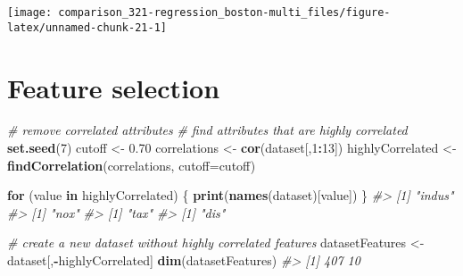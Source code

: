 \documentclass[]{book}
\newenvironment{Shaded}{\begin{snugshade}}{\end{snugshade}}
\newcommand{\CommentTok}[1]{\textcolor[rgb]{0.56,0.35,0.01}{\textit{#1}}}
\newcommand{\ControlFlowTok}[1]{\textcolor[rgb]{0.13,0.29,0.53}{\textbf{#1}}}
\newcommand{\DataTypeTok}[1]{\textcolor[rgb]{0.13,0.29,0.53}{#1}}
\newcommand{\DecValTok}[1]{\textcolor[rgb]{0.00,0.00,0.81}{#1}}
\newcommand{\FloatTok}[1]{\textcolor[rgb]{0.00,0.00,0.81}{#1}}
\newcommand{\KeywordTok}[1]{\textcolor[rgb]{0.13,0.29,0.53}{\textbf{#1}}}
\newcommand{\NormalTok}[1]{#1}
\newcommand{\OperatorTok}[1]{\textcolor[rgb]{0.81,0.36,0.00}{\textbf{#1}}}
\newcommand{\StringTok}[1]{\textcolor[rgb]{0.31,0.60,0.02}{#1}}
\begin{document}
\begin{center}\texttt{[image: comparison\_321-regression\_boston-multi\_files/figure-latex/unnamed-chunk-21-1]} \end{center}

\hypertarget{feature-selection}{%
\section{Feature selection}\label{feature-selection}}

\begin{Shaded}
\begin{Highlighting}[]
\CommentTok{# remove correlated attributes}
\CommentTok{# find attributes that are highly correlated}
\KeywordTok{set.seed}\NormalTok{(}\DecValTok{7}\NormalTok{)}
\NormalTok{cutoff <-}\StringTok{ }\FloatTok{0.70}
\NormalTok{correlations <-}\StringTok{ }\KeywordTok{cor}\NormalTok{(dataset[,}\DecValTok{1}\OperatorTok{:}\DecValTok{13}\NormalTok{])}
\NormalTok{highlyCorrelated <-}\StringTok{ }\KeywordTok{findCorrelation}\NormalTok{(correlations, }\DataTypeTok{cutoff=}\NormalTok{cutoff)}

\ControlFlowTok{for}\NormalTok{ (value }\ControlFlowTok{in}\NormalTok{ highlyCorrelated) \{}
    \KeywordTok{print}\NormalTok{(}\KeywordTok{names}\NormalTok{(dataset)[value])}
\NormalTok{\}}
\CommentTok{#> [1] "indus"}
\CommentTok{#> [1] "nox"}
\CommentTok{#> [1] "tax"}
\CommentTok{#> [1] "dis"}

\CommentTok{# create a new dataset without highly correlated features}
\NormalTok{datasetFeatures <-}\StringTok{ }\NormalTok{dataset[,}\OperatorTok{-}\NormalTok{highlyCorrelated]}
\KeywordTok{dim}\NormalTok{(datasetFeatures)}
\CommentTok{#> [1] 407  10}
\end{Highlighting}
\end{Shaded}
\end{document}
